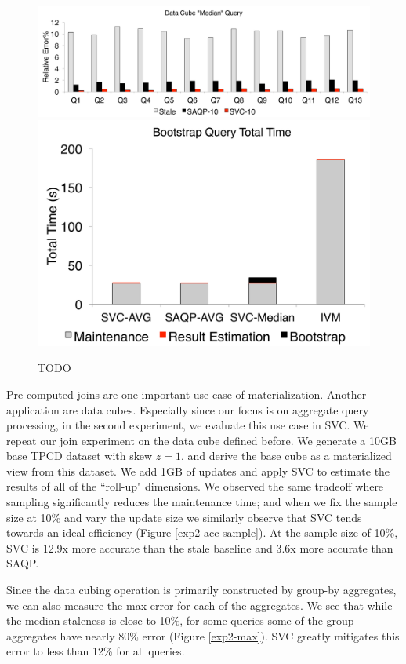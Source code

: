\begin{figure}[t]
\centering
  \includegraphics[scale=0.16]{exp/msdc_5.pdf}
  \includegraphics[scale=0.16]{exp/msdc_6.pdf}
 \caption{TODO \label{exp2-median}}
\end{figure}

Pre-computed joins are one important use case of materialization. 
Another application are data cubes.
Especially since our focus is on aggregate query processing, in the second experiment, we evaluate 
this use case in SVC.
We repeat our join experiment on the data cube defined before.
We generate a 10GB base TPCD dataset with skew $z=1$, and derive the base cube as a materialized view from this dataset.
We add 1GB of updates and apply SVC to estimate the results of all of the ``roll-up" dimensions.
We observed the same tradeoff where sampling significantly reduces the maintenance time; and when we fix the sample size at 10\%
and vary the update size we similarly observe that SVC tends towards an ideal efficiency (Figure \ref{exp2-acc-sample}).
At the sample size of 10\%, SVC is 12.9x more accurate than the stale baseline and 3.6x more accurate than SAQP.

Since the data cubing operation is primarily constructed by group-by aggregates, we can also measure the max error for each of the aggregates.
We see that while the median staleness is close to 10\%, for some queries some of the group aggregates have nearly 80\% error (Figure \ref{exp2-max}).
SVC greatly mitigates this error to less than 12\% for all queries.

